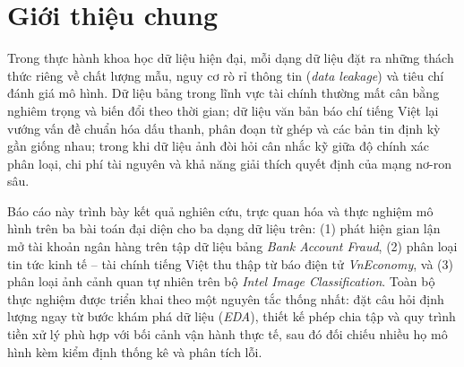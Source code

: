 \section{Giới thiệu chung}
\label{sec:intro}

Trong thực hành khoa học dữ liệu hiện đại, mỗi dạng dữ liệu đặt ra những thách thức riêng về chất lượng mẫu, nguy cơ rò rỉ thông tin (\textit{data leakage}) và tiêu chí đánh giá mô hình. Dữ liệu bảng trong lĩnh vực tài chính thường mất cân bằng nghiêm trọng và biến đổi theo thời gian; dữ liệu văn bản báo chí tiếng Việt lại vướng vấn đề chuẩn hóa dấu thanh, phân đoạn từ ghép và các bản tin định kỳ gần giống nhau; trong khi dữ liệu ảnh đòi hỏi cân nhắc kỹ giữa độ chính xác phân loại, chi phí tài nguyên và khả năng giải thích quyết định của mạng nơ-ron sâu.

Báo cáo này trình bày kết quả nghiên cứu, trực quan hóa và thực nghiệm mô hình trên ba bài toán đại diện cho ba dạng dữ liệu trên: (1) phát hiện gian lận mở tài khoản ngân hàng trên tập dữ liệu bảng \textit{Bank Account Fraud}, (2) phân loại tin tức kinh tế -- tài chính tiếng Việt thu thập từ báo điện tử \textit{VnEconomy}, và (3) phân loại ảnh cảnh quan tự nhiên trên bộ \textit{Intel Image Classification}. Toàn bộ thực nghiệm được triển khai theo một nguyên tắc thống nhất: đặt câu hỏi định lượng ngay từ bước khám phá dữ liệu (\textit{EDA}), thiết kế phép chia tập và quy trình tiền xử lý phù hợp với bối cảnh vận hành thực tế, sau đó đối chiếu nhiều họ mô hình kèm kiểm định thống kê và phân tích lỗi.

